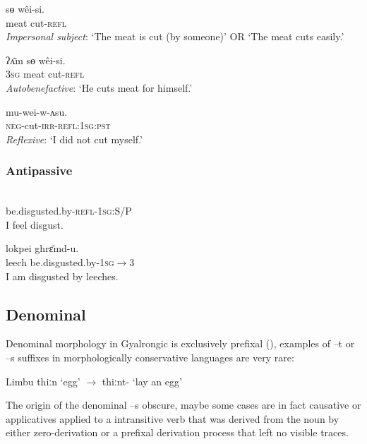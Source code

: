 \documentclass[oldfontcommands,oneside,a4paper,11pt]{article}
\newcommand{\ipa}[1]{{\phon \mbox{#1}}} %
\begin{document}
\begin{exe}
\ex \label{ex:weisi} 
\gll 
 \ipa{sɵ}  	\ipa{wêi-si.}  \\
 meat cut-\textsc{refl} \\
\glt \textit{Impersonal subject}: `The meat is cut (by someone)' OR `The meat cuts easily.'
\end{exe}

\begin{exe}
\ex \label{ex:weisi2} 
\gll 
 \ipa{ʔʌ̄m} \ipa{sɵ}  	\ipa{wêi-si.}  \\
\textsc{3sg} meat cut-\textsc{refl} \\
\glt \textit{Autobenefactive}: `He cuts meat for himself.'
\end{exe}
 
\begin{exe}
\ex \label{ex:weiwasu} 
\gll 
	\ipa{mu-wei-w-ʌsu.}  \\
\textsc{neg}-cut-\textsc{irr}-\textsc{refl:1sg:pst} \\
\glt \textit{Reflexive}: `I did not cut myself.'
\end{exe}  
\subsubsection{Antipassive} 
\begin{exe}
\ex \label{ex:ghryamtsi} 
\gll \ipa{gʰrɛ̄m-si-ŋʌ}\\
 be.disgusted.by-\textsc{refl-1sg:S/P} \\
\glt  I feel disgust.
\end{exe}

\begin{exe}
\ex \label{ex:ghryamt} 
\gll 
  	\ipa{lokpei}  	\ipa{ghrɛ̄md-u.}  \\
leech  be.disgusted.by-\textsc{1sg$\rightarrow$3} \\
 \glt  I am disgusted by leeches.
\end{exe}

\subsection{Denominal}
Denominal morphology in Gyalrongic is exclusively prefixal (\citealt{jacques14antipassive}), examples of \ipa{--t} or \ipa{--s} suffixes in morphologically conservative languages are very rare:

Limbu \ipa{thiːn} `egg' $\rightarrow$ \ipa{thiːnt-} `lay an egg'

The origin of the denominal \ipa{--s} obscure, maybe some cases are in fact causative or applicatives applied to a intransitive verb that was derived from the noun by either zero-derivation or a prefixal derivation process that left no visible traces.
\end{document}
